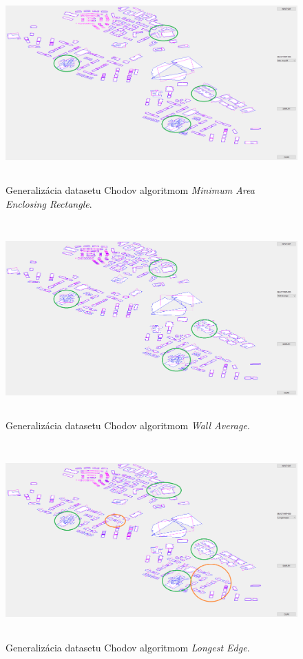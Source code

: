 \documentclass[11pt]{article}
\begin{document}
\begin{figure}[h]
\captionsetup{justification=centering}
\centering
\includegraphics[width=14.65cm, height=7.5cm]{images/chodov_maer.png}
\caption{Generalizácia datasetu Chodov algoritmom \textit{Minimum Area Enclosing Rectangle}.}
\label{fig:obr18}
\end{figure}

\begin{figure}[h]
\captionsetup{justification=centering}
\centering
\includegraphics[width=14.65cm, height=7.5cm]{images/chodov_wa.png}
\caption{Generalizácia datasetu Chodov algoritmom \textit{Wall Average}.}
\label{fig:obr19}
\end{figure}
\newpage

\begin{figure}[h]
\captionsetup{justification=centering}
\centering
\includegraphics[width=14.65cm, height=7.5cm]{images/chodov_le.png}
\caption{Generalizácia datasetu Chodov algoritmom \textit{Longest Edge}.}
\label{fig:obr20}
\end{figure}
\end{document}
